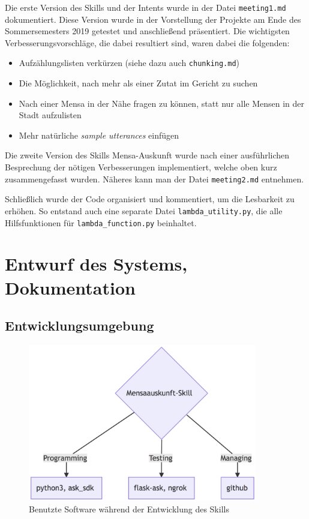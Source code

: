 \documentclass[12pt]{article}
\begin{document}
Die erste Version des Skills und der Intents wurde in der Datei \texttt{meeting1.md} dokumentiert.
Diese Version wurde in der Vorstellung der Projekte am Ende des Sommersemesters 2019 getestet und anschließend präsentiert.
Die wichtigsten Verbesserungsvorschläge, die dabei resultiert sind, waren dabei die folgenden:
\begin{itemize}
  \setlength\itemsep{0em}
  \item Aufzählungslisten verkürzen (siehe dazu auch  \texttt{chunking.md})
  \item Die Möglichkeit, nach mehr als einer Zutat im Gericht zu suchen
  \item Nach einer Mensa in der Nähe fragen zu können, statt nur alle Mensen in der Stadt aufzulisten
  \item Mehr natürliche \emph{sample utterances} einfügen
\end{itemize}

Die zweite Version des Skills Mensa-Auskunft wurde nach einer ausführlichen Besprechung der nötigen Verbesserungen implementiert, welche oben kurz zusammengefasst wurden. 
Näheres kann man der Datei \texttt{meeting2.md} entnehmen. 

Schließlich wurde der Code organisiert und kommentiert, um die Lesbarkeit zu erhöhen. 
So entstand auch eine separate Datei \texttt{lambda\_utility.py}, die alle Hilfsfunktionen für \texttt{lambda\_function.py} beinhaltet. 

\section{Entwurf des Systems, Dokumentation}
\subsection{Entwicklungsumgebung}
\begin{figure}[h]
\center
\includegraphics[width=10cm]{mermaid-diagram.png}
\caption{Benutzte Software während der Entwicklung des Skills}
\end{figure}
\end{document}
